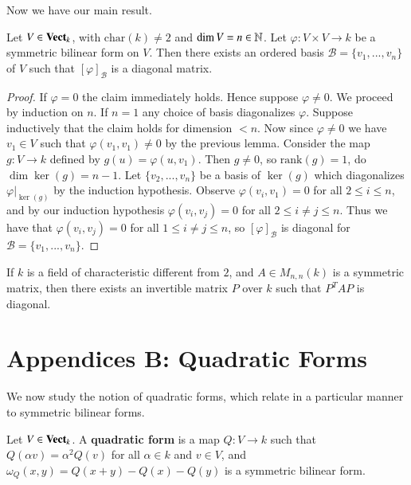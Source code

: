 Now we have our main result.

\begin{theorem}
    Let $V \in \normalfont\textbf{Vect}_{k}$, with $\text{char}(k) \neq 2$ and $\dim V = n \in \mathbb N$. Let $\varphi:V\times V\rightarrow k$ be a symmetric bilinear form on $V$. Then there exists an ordered basis $\mathcal{B} = \{v_1,...,v_n\}$ of $V$ such that $[\varphi]_{\mathcal{B}}$ is a diagonal matrix.
\end{theorem}
\begin{proof}
    If $\varphi = 0$ the claim immediately holds. Hence suppose $\varphi \neq 0$. We proceed by induction on $n$. If $n = 1$ any choice of basis diagonalizes $\varphi$. Suppose inductively that the claim holds for dimension $< n$. Now since $\varphi \neq 0$ we have $v_1 \in V$ such that $\varphi(v_1,v_1) \neq 0$ by the previous lemma. Consider the map $g:V\rightarrow k$ defined by $g(u) = \varphi(u,v_1)$. Then $g\neq 0$, so $\text{rank}(g) =1$, do $\dim\ker(g) = n-1$. Let $\{v_2,...,v_n\}$ be a basis of $\ker(g)$ which diagonalizes $\varphi\vert_{\ker(g)}$ by the induction hypothesis. Observe $\varphi(v_i,v_1) = 0$ for all $2 \leq i \leq n$, and by our induction hypothesis $\varphi(v_i,v_j) = 0$ for all $2 \leq i\neq j \leq n$. Thus we have that $\varphi(v_i,v_j) = 0$ for all $1\leq i\neq j\leq n$, so $[\varphi]_{\mathcal{B}}$ is diagonal for $\mathcal{B} = \{v_1,...,v_n\}$.
\end{proof}

\begin{corollary}
    If $k$ is a field of characteristic different from $2$, and $A \in M_{n,n}(k)$ is a symmetric matrix, then there exists an invertible matrix $P$ over $k$ such that $P^TAP$ is diagonal.
\end{corollary}




%
\section*{Appendices B: Quadratic Forms}
%


We now study the notion of quadratic forms, which relate in a particular manner to symmetric bilinear forms.

\begin{definition}
    Let $V \in \normalfont\textbf{Vect}_{k}$. A \textbf{quadratic form} is a map $Q:V\rightarrow k$ such that $Q(\alpha v) = \alpha^2Q(v)$ for all $\alpha \in k$ and $v \in V$, and $\omega_Q(x,y) = Q(x+y) - Q(x) - Q(y)$ is a symmetric bilinear form.
\end{definition}

